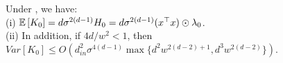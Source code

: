 \begin{theorem}\label{th:main} Under , we have:\\
(i) $\mathbb{E}\left[K_0\right]=d\sigma^{2(d-1)} H_0=d\sigma^{2(d-1)} (x^\top x)\odot \lambda_0$.\\
(ii) In addition, if ${4d}/{w^2}<1$, then $Var\left[K_0\right]\leq O\left(d^2_{in}\sigma^{4(d-1)}\max\{d^2w^{2(d-2)+1}, d^3w^{2(d-2)}\}\right)$.
\end{theorem}

